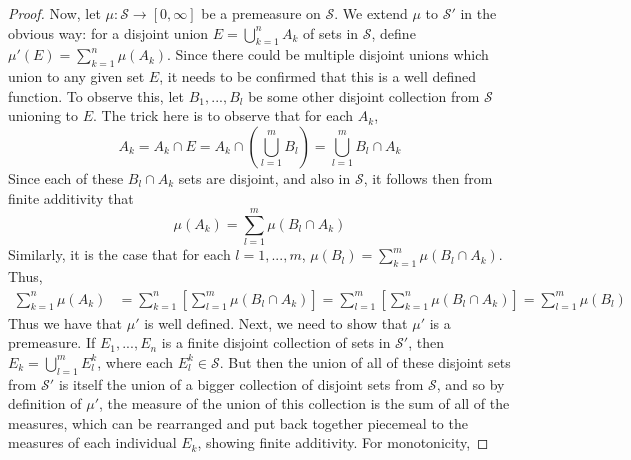 \documentclass{article}
\theoremstyle{definition}
\newtheorem{definition}{Definition}[section]
\theoremstyle{plain}
\theoremstyle{theorem}
\begin{document}
\begin{proof}
Now, let $\mu:\mathcal{S} \to [0,\infty]$ be a premeasure on $\mathcal{S}$. We extend $\mu$ to $\mathcal{S}'$ in the obvious way: for a disjoint union $E = \bigcup_{k=1}^n A_k$ of sets in $\mathcal{S}$, define $\mu'(E) = \sum_{k=1}^n \mu(A_k)$. Since there could be multiple disjoint unions which union to any given set $E$, it needs to be confirmed that this is a well defined function. To observe this, let $B_1,...,B_l$ be some other disjoint collection from $\mathcal{S}$ unioning to $E$. The trick here is to observe that for each $A_k$,  \[  A_k = A_k \cap E = A_k \cap \left( \bigcup_{l=1}^m B_l \right) = \bigcup_{l=1}^m B_l \cap A_k \]
Since each of these $B_l \cap A_k$ sets are disjoint, and also in $\mathcal{S}$, it follows then from finite additivity that
\[ \mu(A_k) = \sum_{l=1}^m \mu(B_l \cap A_k) \]
Similarly, it is the case that for each $l=1,...,m$, $\mu(B_l) = \sum_{k=1}^m \mu(B_l \cap A_k)$. Thus, 
\begin{align} 
\sum_{k=1}^n \mu(A_k) &= \sum_{k=1}^n \left[ \sum_{l=1}^m \mu(B_l \cap A_k) \right]
					= \sum_{l=1}^m \left[ \sum_{k=1}^n \mu(B_l \cap A_k) \right]
					= \sum_{l=1}^m \mu(B_l)
\end{align}
Thus we have that $\mu'$ is well defined. Next, we need to show that $\mu'$ is a premeasure. If $E_1,...,E_n$ is a finite disjoint collection of sets in $\mathcal{S}'$, then $E_k = \bigcup_{l=1}^m E^k_l$, where each $E^k_l \in \mathcal{S}$. But then the union of all of these disjoint sets from $\mathcal{S}'$ is itself the union of a bigger collection of disjoint sets from $\mathcal{S}$, and so by definition of $\mu'$, the measure of the union of this collection is the sum of all of the measures, which can be rearranged and put back together piecemeal to the measures of each individual $E_k$, showing finite additivity. For monotonicity, 
\end{proof}

\end{document}
